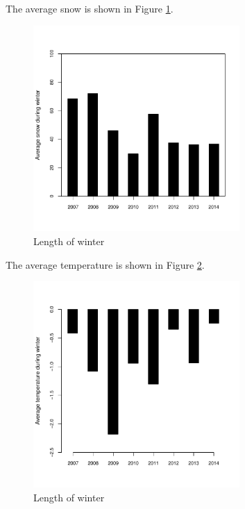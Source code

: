 \documentclass[12pt,twoside]{article}
\begin{document}
{The average snow is shown in Figure \ref{fig:averagesnow}. \lipsum[5]


\begin{figure}[!ht]
\begin{center}
\includegraphics[width=0.7\textwidth]{report-averagesnow}
\end{center}
\caption{Length of winter}
\label{fig:averagesnow}
\end{figure}

The average temperature is shown in Figure \ref{fig:averagetemp}. \lipsum[6]



\begin{figure}[!ht]
\begin{center}
\includegraphics[width=0.7\textwidth]{report-averagetemp}
\end{center}
\caption{Length of winter}
\label{fig:averagetemp}
\end{figure}

}
\end{document}
